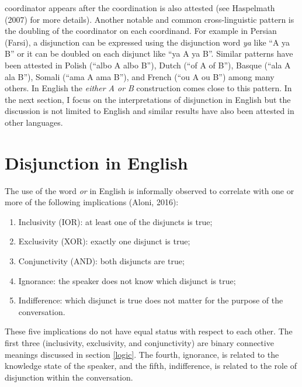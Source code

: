 \documentclass[oneside]{report}
\theoremstyle{definition}
\theoremstyle{definition}
\theoremstyle{definition}
\theoremstyle{remark}
\begin{document}
coordinator appears after the coordination is also attested (see
Haspelmath (2007) for more details). Another notable and common
cross-linguistic pattern is the doubling of the coordinator on each
coordinand. For example in Persian (Farsi), a disjunction can be
expressed using the disjunction word \emph{ya} like ``A ya B'' or it can
be doubled on each disjunct like ``ya A ya B''. Similar patterns have
been attested in Polish (``albo A albo B''), Dutch (``of A of B''),
Basque (``ala A ala B''), Somali (``ama A ama B''), and French (``ou A
ou B'') among many others. In English the \emph{either A or B}
construction comes close to this pattern. In the next section, I focus
on the interpretations of disjunction in English but the discussion is
not limited to English and similar results have also been attested in
other languages.

\section{Disjunction in English}\label{disjunction-in-english}

The use of the word \emph{or} in English is informally observed to
correlate with one or more of the following implications (Aloni, 2016):
\begin{enumerate}
\def\labelenumi{\arabic{enumi}.}
\tightlist
\item
  Inclusivity (IOR): at least one of the disjuncts is true;
\item
  Exclusivity (XOR): exactly one disjunct is true;
\item
  Conjunctivity (AND): both disjuncts are true;
\item
  Ignorance: the speaker does not know which disjunct is true;
\item
  Indifference: which disjunct is true does not matter for the purpose
  of the conversation.
\end{enumerate}
These five implications do not have equal status with respect to each
other. The first three (inclusivity, exclusivity, and conjunctivity) are
binary connective meanings discussed in section \ref{logic}. The fourth,
ignorance, is related to the knowledge state of the speaker, and the
fifth, indifference, is related to the role of disjunction within the
conversation.
\end{document}
